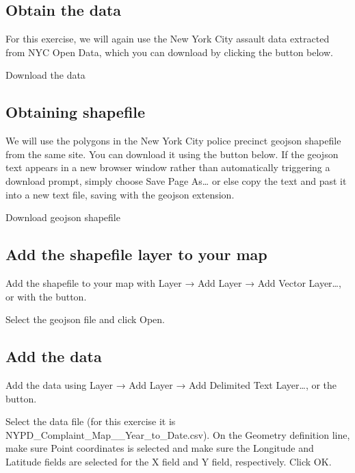 \documentclass[]{book}
\begin{document}
\hypertarget{obtain-the-data}{%
\subsection{Obtain the data}\label{obtain-the-data}}

For this exercise, we will again use the New York City assault data extracted from NYC Open Data, which you can download by clicking the button below.

Download the data

\hypertarget{obtaining-shapefile}{%
\subsection{Obtaining shapefile}\label{obtaining-shapefile}}

We will use the polygons in the New York City police precinct geojson shapefile from the same site. You can download it using the button below. If the geojson text appears in a new browser window rather than automatically triggering a download prompt, simply choose Save Page As\ldots{} or else copy the text and past it into a new text file, saving with the geojson extension.

Download geojson shapefile

\hypertarget{add-the-shapefile-layer-to-your-map}{%
\subsection{Add the shapefile layer to your map}\label{add-the-shapefile-layer-to-your-map}}

Add the shapefile to your map with Layer → Add Layer → Add Vector Layer\ldots{}, or with the {} button.

Select the geojson file and click Open.

\hypertarget{add-the-data}{%
\subsection{Add the data}\label{add-the-data}}

Add the data using Layer → Add Layer → Add Delimited Text Layer\ldots{}, or the {} button.

Select the data file (for this exercise it is NYPD\_Complaint\_Map\_\_Year\_to\_Date.csv). On the Geometry definition line, make sure Point coordinates is selected and make sure the Longitude and Latitude fields are selected for the X field and Y field, respectively. Click OK.
\end{document}
